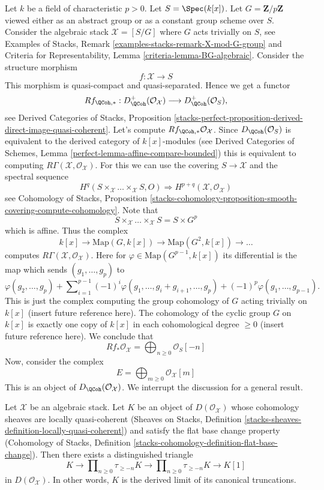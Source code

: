 \noindent
Let $k$ be a field of characteristic $p > 0$. Let $S = \Spec(k[x])$.
Let $G = \mathbf{Z}/p\mathbf{Z}$ viewed either as an abstract group
or as a constant group scheme over $S$. Consider the algebraic stack
$\mathcal{X} = [S/G]$ where $G$ acts trivially on $S$, see
Examples of Stacks, Remark \ref{examples-stacks-remark-X-mod-G-group}
and
Criteria for Representability, Lemma \ref{criteria-lemma-BG-algebraic}.
Consider the structure morphism
$$
f : \mathcal{X} \longrightarrow S
$$
This morphism is quasi-compact and quasi-separated. Hence we get a functor
$$
Rf_{\QCoh, *} :
D^{+}_\QCoh(\mathcal{O}_\mathcal{X})
\longrightarrow
D^{+}_\QCoh(\mathcal{O}_S),
$$
see 
Derived Categories of Stacks, Proposition
\ref{stacks-perfect-proposition-derived-direct-image-quasi-coherent}.
Let's compute $Rf_{\QCoh, *}\mathcal{O}_\mathcal{X}$.
Since $D_\QCoh(\mathcal{O}_S)$ is equivalent to
the derived category of $k[x]$-modules (see
Derived Categories of Schemes, Lemma
\ref{perfect-lemma-affine-compare-bounded})
this is equivalent to computing
$R\Gamma(\mathcal{X}, \mathcal{O}_\mathcal{X})$.
For this we can use the covering $S \to \mathcal{X}$ and the spectral
sequence
$$
H^q(S \times_\mathcal{X} \ldots \times_\mathcal{X} S, O)
\Rightarrow H^{p + q}(\mathcal{X}, \mathcal{O}_\mathcal{X})
$$
see
Cohomology of Stacks, Proposition
\ref{stacks-cohomology-proposition-smooth-covering-compute-cohomology}.
Note that
$$
S \times_\mathcal{X} \ldots \times_\mathcal{X} S = S \times G^p
$$
which is affine. Thus the complex
$$
k[x] \to \text{Map}(G, k[x]) \to \text{Map}(G^2, k[x]) \to \ldots
$$
computes $R\Gamma(\mathcal{X}, \mathcal{O}_\mathcal{X})$.
Here for $\varphi \in \text{Map}(G^{p - 1}, k[x])$ its differential is
the map which sends $(g_1, \ldots, g_p)$ to
$$
\varphi(g_2, \ldots, g_p) +
\sum\nolimits_{i = 1}^{p - 1}
(-1)^i\varphi(g_1, \ldots, g_i + g_{i + 1}, \ldots, g_p)
+ (-1)^p\varphi(g_1, \ldots, g_{p - 1}).
$$
This is just the complex computing the group cohomology of $G$ acting
trivially on $k[x]$ (insert future reference here). The cohomology of
the cyclic group $G$ on $k[x]$ is exactly one copy of $k[x]$ in each
cohomological degree $\geq 0$ (insert future reference here). We conclude
that
$$
Rf_*\mathcal{O}_\mathcal{X} = \bigoplus\nolimits_{n \geq 0} \mathcal{O}_S[-n]
$$
Now, consider the complex
$$
E = \bigoplus\nolimits_{m \geq 0} \mathcal{O}_\mathcal{X}[m]
$$
This is an object of $D_\QCoh(\mathcal{O}_\mathcal{X})$. We interrupt the
discussion for a general result.

\begin{lemma}
\label{lemma-is-limit}
Let $\mathcal{X}$ be an algebraic stack. Let $K$ be an object of
$D(\mathcal{O}_\mathcal{X})$ whose cohomology sheaves are locally
quasi-coherent (Sheaves on Stacks, Definition
\ref{stacks-sheaves-definition-locally-quasi-coherent})
and satisfy the flat base change property (Cohomology of Stacks,
Definition \ref{stacks-cohomology-definition-flat-base-change}).
Then there exists a distinguished triangle
$$
K \to
\prod\nolimits_{n \geq 0} \tau_{\geq -n} K \to
\prod\nolimits_{n \geq 0} \tau_{\geq -n} K \to K[1]
$$
in $D(\mathcal{O}_\mathcal{X})$. In other words, $K$ is the derived
limit of its canonical truncations.
\end{lemma}

